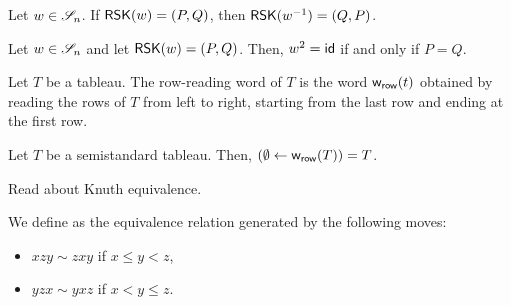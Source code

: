 \begin{corollary}
    Let \(w \in \mathscr{S}_{n}\).
    If \(\operatorname{\mathsf{RSK}}(w) = (P, Q)\),
    then \(\operatorname{\mathsf{RSK}}(w^{-1}) = (Q, P)\).
\end{corollary}

\begin{corollary}
    Let \(w \in \mathscr{S}_{n}\) and let \(\operatorname{\mathsf{RSK}}(w) = (P, Q)\).
    Then, \(w^2 = \operatorname{\mathsf{id}}\) if and only if \(P = Q\).
\end{corollary}

\begin{definition}
    Let \(T\) be a tableau.
    The row-reading word of \(T\) is the word 
    \(\operatorname{\mathsf{w}_{\text{\textsf{row}}}}(t)\) obtained by reading the rows of \(T\) from left to right,
    starting from the last row and ending at the first row.
\end{definition}

\begin{lemma}
    Let \(T\) be a semistandard tableau.
    Then, \((\emptyset \leftarrow \operatorname{\mathsf{w}_{\text{\textsf{row}}}}(T)) = T\).
\end{lemma}

Read \cite{Fulton1997} about Knuth equivalence.

\begin{definition}
    We define  as the equivalence relation generated by the following moves:
    \begin{itemize}
        \item \(xzy \sim zxy\) if \(x \leq y < z\),
        \item \(yzx \sim yxz\) if \(x < y \leq z\).
    \end{itemize}
\end{definition}